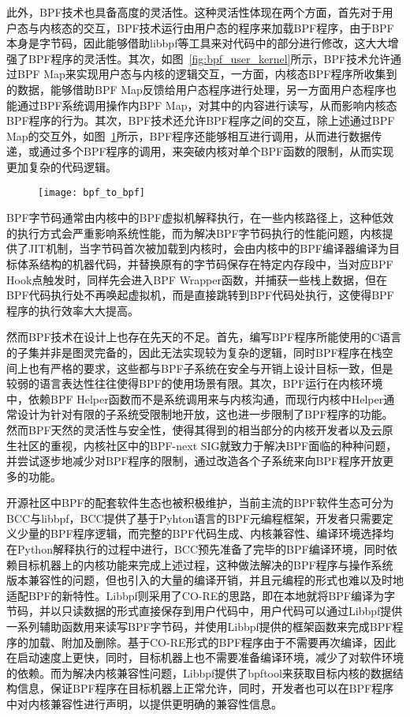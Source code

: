 此外，BPF技术也具备高度的灵活性。这种灵活性体现在两个方面，首先对于用户态与内核态的交互，BPF技术运行由用户态的程序来加载BPF程序，由于BPF本身是字节码，因此能够借助libbpf等工具来对代码中的部分进行修改，这大大增强了BPF程序的灵活性。其次，如图~\ref{fig:bpf_user_kernel}所示，BPF技术允许通过BPF Map来实现用户态与内核的逻辑交互，一方面，内核态BPF程序所收集到的数据，能够借助BPF Map反馈给用户态程序进行处理，另一方面用户态程序也能通过BPF系统调用操作内BPF Map，对其中的内容进行读写，从而影响内核态BPF程序的行为。其次，BPF技术还允许BPF程序之间的交互，除上述通过BPF Map的交互外，如图~\ref{fig:bpf_to_bpf}所示，BPF程序还能够相互进行调用，从而进行数据传递，或通过多个BPF程序的调用，来突破内核对单个BPF函数的限制，从而实现更加复杂的代码逻辑。

\begin{figure}[!htbp]
    \centering
    \texttt{[image: bpf\_to\_bpf]}
    \label{fig:bpf_to_bpf}
\end{figure}

BPF字节码通常由内核中的BPF虚拟机解释执行，在一些内核路径上，这种低效的执行方式会严重影响系统性能，而为解决BPF字节码执行的性能问题，内核提供了JIT机制，当字节码首次被加载到内核时，会由内核中的BPF编译器编译为目标体系结构的机器代码，并替换原有的字节码保存在特定内存段中，当对应BPF Hook点触发时，同样先会进入BPF Wrapper函数，并捕获一些栈上数据，但在BPF代码执行处不再唤起虚拟机，而是直接跳转到BPF代码处执行，这使得BPF程序的执行效率大大提高。

然而BPF技术在设计上也存在先天的不足。首先，编写BPF程序所能使用的C语言的子集并非是图灵完备的，因此无法实现较为复杂的逻辑，同时BPF程序在栈空间上也有严格的要求，这些都与BPF子系统在安全与开销上设计目标一致，但是较弱的语言表达性往往使得BPF的使用场景有限。其次，BPF运行在内核环境中，依赖BPF Helper函数而不是系统调用来与内核沟通，而现行内核中Helper通常设计为针对有限的子系统受限制地开放，这也进一步限制了BPF程序的功能。然而BPF天然的灵活性与安全性，使得其得到的相当部分的内核开发者以及云原生社区的重视，内核社区中的BPF-next SIG就致力于解决BPF面临的种种问题，并尝试逐步地减少对BPF程序的限制，通过改造各个子系统来向BPF程序开放更多的功能。

开源社区中BPF的配套软件生态也被积极维护，当前主流的BPF软件生态可分为BCC\citep{bcc}与libbpf\citep{libbpf}，BCC提供了基于Pyhton语言的BPF元编程框架，开发者只需要定义少量的BPF程序逻辑，而完整的BPF代码生成、内核兼容性、编译环境选择均在Python解释执行的过程中进行，BCC预先准备了完毕的BPF编译环境，同时依赖目标机器上的内核功能来完成上述过程，这种做法解决的BPF程序与操作系统版本兼容性的问题，但也引入的大量的编译开销，并且元编程的形式也难以及时地适配BPF的新特性。Libbpf则采用了CO-RE的思路，即在本地就将BPF编译为字节码，并以只读数据的形式直接保存到用户代码中，用户代码可以通过Libbpf提供一系列辅助函数用来读写BPF字节码，并使用Libbpf提供的框架函数来完成BPF程序的加载、附加及删除。基于CO-RE形式的BPF程序由于不需要再次编译，因此在启动速度上更快，同时，目标机器上也不需要准备编译环境，减少了对软件环境的依赖。而为解决内核兼容性问题，Libbpf提供了bpftool来获取目标内核的数据结构信息，保证BPF程序在目标机器上正常允许，同时，开发者也可以在BPF程序中对内核兼容性进行声明，以提供更明确的兼容性信息。


